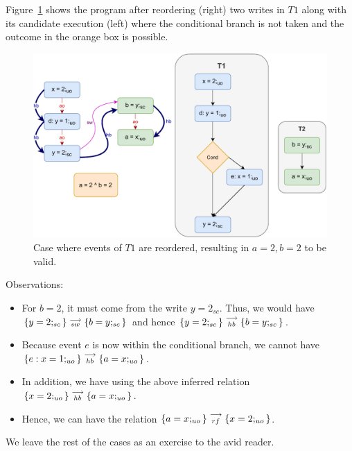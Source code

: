     Figure~\ref{reord:cond_counter_example2(b)} shows the program after reordering (right) two writes in $T1$ along with its candidate execution (left) where the conditional branch is not taken and the outcome in the orange box is possible\footnotemark. 
    \begin{figure}[H]
        \centering 
        \includegraphics[scale=0.7]{7.CounterExamples/ReorderingConditionals/CounterExamples2b(Conditionals).pdf}
        \caption{Case where events of $T1$ are reordered, resulting in $a = 2,  b = 2$ to be valid.}
        \label{reord:cond_counter_example2(b)}
    \end{figure}

    Observations:
    \begin{itemize}
        \item For $b=2$, it must come from the write $y=2_{sc}$. 
        Thus, we would have $\{y=2;_{sc}\}\stackrel{\longrightarrow}{_{sw}}\{b=y;_{sc}\}$ and hence $\{y=2;_{sc}\}\stackrel{\longrightarrow}{_{hb}}\{b=y;_{sc}\}$.
        \item Because event $e$ is now within the conditional branch, we cannot have $\{e:x=1;_{uo}\}\stackrel{\longrightarrow}{_{hb}}\{a=x;_{uo}\}$.
        \item In addition, we have using the above inferred relation $\{x=2;_{uo}\}\stackrel{\longrightarrow}{_{hb}}\{a=x;_{uo}\}$.
        \item Hence, we can have the relation $\{a=x;_{uo}\}\stackrel{\longrightarrow}{_{rf}}\{x=2;_{uo}\}$.
    \end{itemize}
    We leave the rest of the cases as an exercise to the avid reader\footnotemark.

